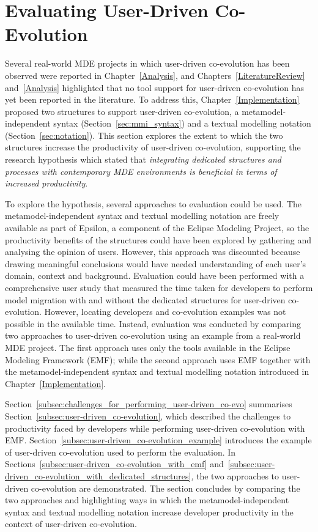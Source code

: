 
\section{Evaluating User-Driven Co-Evolution}
\label{sec:exemplar_user-driven_co-evo}
Several real-world MDE projects in which user-driven co-evolution has been observed were reported in Chapter~\ref{Analysis}, and Chapters~\ref{LiteratureReview} and~\ref{Analysis} highlighted that no tool support for user-driven co-evolution has yet been reported in the literature. To address this, Chapter~\ref{Implementation} proposed two structures to support user-driven co-evolution, a metamodel-independent syntax (Section~\ref{sec:mmi_syntax}) and a textual modelling notation (Section~\ref{sec:notation}). This section explores the extent to which the two structures increase the productivity of user-driven co-evolution, supporting the research hypothesis which stated that \emph{integrating dedicated structures and processes with contemporary MDE environments is beneficial in terms of increased productivity}.

To explore the hypothesis, several approaches to evaluation could be used. The metamodel-independent syntax and textual modelling notation are freely available as part of Epsilon, a component of the Eclipse Modeling Project, so the productivity benefits of the structures could have been explored by gathering and analysing the opinion of users. However, this approach was discounted because drawing meaningful conclusions would have needed understanding of each user's domain, context and background. Evaluation could have been performed with a comprehensive user study that measured the time taken for developers to perform model migration with and without the dedicated structures for user-driven co-evolution. However, locating developers and co-evolution examples was not possible in the available time. Instead, evaluation was conducted by comparing two approaches to user-driven co-evolution using an example from a real-world MDE project. The first approach uses only the tools available in the Eclipse Modeling Framework (EMF); while the second approach uses EMF together with the metamodel-independent syntax and textual modelling notation introduced in Chapter~\ref{Implementation}.

Section~\ref{subsec:challenges_for_performing_user-driven_co-evo} summarises Section~\ref{subsec:user-driven_co-evolution}, which described the challenges to productivity faced by developers while performing user-driven co-evolution with EMF. Section~\ref{subsec:user-driven_co-evolution_example} introduces the example of user-driven co-evolution used to perform the evaluation. In Sections~\ref{subsec:user-driven_co-evolution_with_emf} and~\ref{subsec:user-driven_co-evolution_with_dedicated_structures}, the two approaches to user-driven co-evolution are demonstrated. The section concludes by comparing the two approaches and highlighting ways in which the metamodel-independent syntax and textual modelling notation increase developer productivity in the context of user-driven co-evolution.

